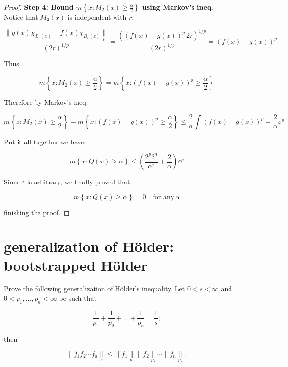 \begin{proof}
\textbf{Step 4: Bound \(m\left\{ {x:M_{2}(x) \geq \frac{\alpha}{2}} \right\}\) using Markov's ineq.}\\
Notice that \(M_{2}(x)\) is independent with \(r\):

\[\frac{\parallel g(x)\chi_{B_{r}(x)} - f(x)\chi_{B_{r}(x)}\underset{p}{\parallel}}{(2r)^{1/p}} = \frac{((f(x) - g(x))^{p}\, 2r)^{1/p}}{(2r)^{1/p}} = (f(x) - g(x))^{p}\]

Thus

\[m\left\{ {x:M_{2}(x) \geq \frac{\alpha}{2}} \right\} = m\left\{ {x:(f(x) - g(x))^{p} \geq \frac{\alpha}{2}} \right\}\]

Therefore by Markov's ineq:

\[m\left\{ {x:M_{2}(x) \geq \frac{\alpha}{2}} \right\} = m\left\{ {x:(f(x) - g(x))^{p} \geq \frac{\alpha}{2}} \right\} \leq \frac{2}{\alpha}\int(f(x) - g(x))^{p} = \frac{2}{\alpha}\varepsilon^{p}\]

Put it all together we have:

\[m\left\{ {x:Q(x) \geq \alpha} \right\} \leq (\frac{2^{p}3^{n}}{\alpha^{p}} + \frac{2}{\alpha})\varepsilon^{p}\]

Since \(\varepsilon\) is arbitrary, we finally proved that

\[m\left\{ {x:Q(x) \geq \alpha} \right\} = 0\quad\text{for any}\ \alpha\]

finishing the proof.

\end{proof}

\section{\texorpdfstring{\textbf{generalization of Hölder}: bootstrapped Hölder}{generalization of Hölder: bootstrapped Hölder}}\label{generalization-of-huxf6lder-bootstrapped-huxf6lder}

Prove the following generalization of Hölder's inequality. Let \(0 < s < \infty\) and \(0 < p_{1},\ldots,p_{n} < \infty\) be such that

\[\frac{1}{p_{1}} + \frac{1}{p_{2}} + \ldots + \frac{1}{p_{n}} = \frac{1}{s};\]

then

\[\parallel f_{1}f_{2}\cdots f_{n}\underset{s}{\parallel} \leq \parallel f_{1}\underset{p_{1}}{\parallel} \parallel f_{2}\underset{p_{2}}{\parallel}\cdots \parallel f_{n}\underset{p_{n}}{\parallel}.\]

